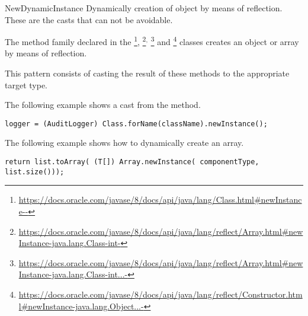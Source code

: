 \begin{pattern}{NewDynamicInstance}
Dynamically creation of object by means of reflection.
These are the casts that can not be avoidable.

The  method family declared in the
\footnote{\url{https://docs.oracle.com/javase/8/docs/api/java/lang/Class.html\#newInstance--}},
\footnote{\url{https://docs.oracle.com/javase/8/docs/api/java/lang/reflect/Array.html\#newInstance-java.lang.Class-int-}}\(^{,}\)
\footnote{\url{https://docs.oracle.com/javase/8/docs/api/java/lang/reflect/Array.html\#newInstance-java.lang.Class-int...-}} and
\footnote{\url{https://docs.oracle.com/javase/8/docs/api/java/lang/reflect/Constructor.html\#newInstance-java.lang.Object...-}}
classes creates an object or array by means of reflection.

This pattern consists of casting the result of these methods to the appropriate target type.

\instances


The following example shows a cast from the 
method.

\begin{lstlisting}[style=java,caption={The \pname{} pattern using the \texttt{Class} class.}]
logger = (AuditLogger) Class.forName(className).newInstance();
\end{lstlisting}

The following example shows how to dynamically create an array.

\begin{lstlisting}[style=java,caption={Example of the \pname{} pattern using the \texttt{Array} class.}]
return list.toArray( (T[]) Array.newInstance( componentType, list.size()));
\end{lstlisting}



\end{pattern}
